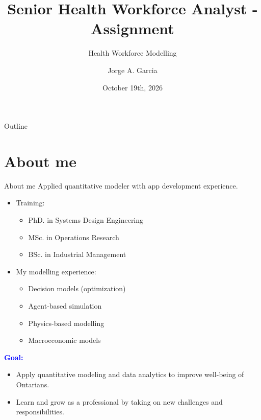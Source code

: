 \documentclass[aspectratio=169, 10pt]{beamer}
\title{Senior Health Workforce Analyst - Assignment}
\subtitle{Health Workforce Modelling}
\author{Jorge A. Garcia}
\date{October 19th, 2026}
\begin{document}
\begin{frame}
    \titlepage
\end{frame}


\begin{frame}{Outline}
    \tableofcontents
\end{frame}


\section{About me}
\begin{frame}{About me}
    Applied quantitative modeler with app development experience.
    \begin{itemize}
        \item Training:
        \begin{itemize}
            \item PhD. in Systems Design Engineering
            \item MSc. in Operations Research
            \item BSc. in Industrial Management
        \end{itemize}
        \vspace{0.3cm}
        \item My modelling experience:
        \begin{itemize}
            \item Decision models (optimization)
            \item Agent-based simulation
            \item Physics-based modelling
            \item Macroeconomic models
        \end{itemize}
    \end{itemize}
    \textcolor{blue}{\textbf{Goal:}}
    \begin{itemize}
        \item Apply quantitative modeling and data analytics to improve well-being of Ontarians.
        \item Learn and grow as a professional by taking on new challenges and responsibilities.
    \end{itemize}
\end{frame}
\end{document}
